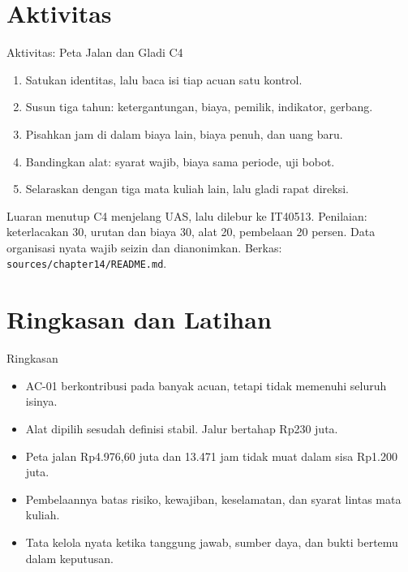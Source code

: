 \documentclass[aspectratio=169, table, 12pt]{beamer}
\begin{document}
\section{Aktivitas}

\begin{frame}{{\Large Aktivitas: Peta Jalan dan Gladi C4}}
  \vspace{6pt}
  \small
  \begin{enumerate}
    \item Satukan identitas, lalu baca isi tiap acuan satu kontrol.
    \item Susun tiga tahun: ketergantungan, biaya, pemilik, indikator, gerbang.
    \item Pisahkan jam di dalam biaya lain, biaya penuh, dan uang baru.
    \item Bandingkan alat: syarat wajib, biaya sama periode, uji bobot.
    \item Selaraskan dengan tiga mata kuliah lain, lalu gladi rapat direksi.
  \end{enumerate}

  \vspace{4pt}
  \footnotesize Luaran menutup C4 menjelang UAS, lalu dilebur ke IT40513. Penilaian: keterlacakan 30,
  urutan dan biaya 30, alat 20, pembelaan 20 persen. Data organisasi nyata wajib seizin dan
  dianonimkan. Berkas: \texttt{sources/chapter14/README.md}.
\end{frame}

\section{Ringkasan dan Latihan}

\begin{frame}{{\Large Ringkasan}}
  \vspace{6pt}
  \small
  \begin{itemize}
    \item AC-01 berkontribusi pada banyak acuan, tetapi tidak memenuhi seluruh isinya.
    \item Alat dipilih sesudah definisi stabil. Jalur bertahap Rp230 juta.
    \item Peta jalan Rp4.976,60 juta dan 13.471 jam tidak muat dalam sisa Rp1.200 juta.
    \item Pembelaannya batas risiko, kewajiban, keselamatan, dan syarat lintas mata kuliah.
    \item Tata kelola nyata ketika tanggung jawab, sumber daya, dan bukti bertemu dalam keputusan.
  \end{itemize}
\end{frame}
\end{document}
